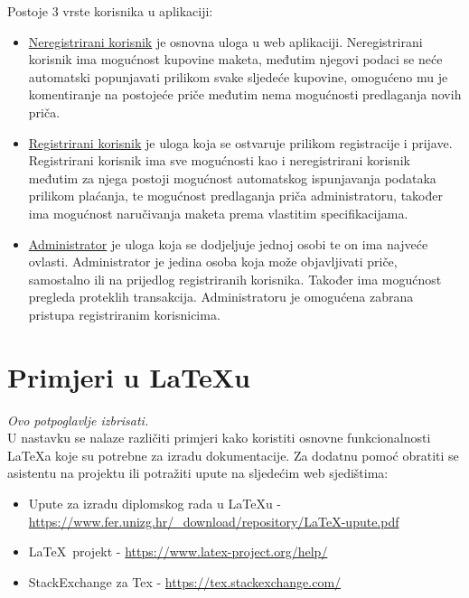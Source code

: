 		Postoje 3 vrste korisnika u aplikaciji:
		\begin{itemize}
			\item \underline{Neregistrirani korisnik} je osnovna uloga u web aplikaciji. Neregistrirani korisnik ima mogućnost kupovine maketa, međutim njegovi podaci se neće automatski popunjavati prilikom svake sljedeće kupovine, omogućeno mu je komentiranje na postojeće priče međutim nema mogućnosti predlaganja novih priča.
			\item \underline{Registrirani korisnik} je uloga koja se ostvaruje prilikom registracije i prijave. Registrirani korisnik ima sve mogućnosti kao i neregistrirani korisnik međutim za njega postoji mogućnost automatskog ispunjavanja podataka prilikom plaćanja, te mogućnost predlaganja priča administratoru, također ima mogućnost naručivanja maketa prema vlastitim specifikacijama.
			\item \underline{Administrator} je uloga koja se dodjeljuje jednoj osobi te on ima najveće ovlasti. Administrator je jedina osoba koja može objavljivati priče, samostalno ili na prijedlog registriranih korisnika. Također ima mogućnost pregleda proteklih transakcija. Administratoru je omogućena zabrana pristupa registriranim korisnicima.
		\end{itemize}
		
		\section{Primjeri u \LaTeX u}
		
		
		
		\textit{Ovo potpoglavlje izbrisati.}\\

		U nastavku se nalaze različiti primjeri kako koristiti osnovne funkcionalnosti \LaTeX a koje su potrebne za izradu dokumentacije. Za dodatnu pomoć obratiti se asistentu na projektu ili potražiti upute na sljedećim web sjedištima:
		\begin{itemize}
			\item Upute za izradu diplomskog rada u \LaTeX u - \url{https://www.fer.unizg.hr/_download/repository/LaTeX-upute.pdf}
			\item \LaTeX\ projekt - \url{https://www.latex-project.org/help/}
			\item StackExchange za Tex - \url{https://tex.stackexchange.com/}\\
		
		\end{itemize} 	


